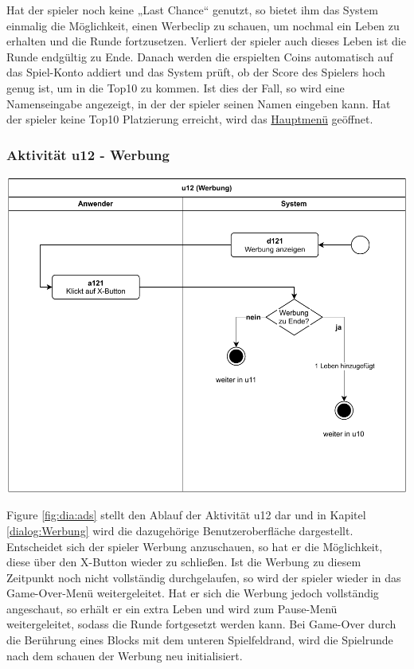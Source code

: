 Hat der \gls{spieler} noch keine „Last Chance“ genutzt, so bietet ihm das System einmalig die Möglichkeit, einen Werbeclip zu schauen, um nochmal ein Leben zu erhalten und die Runde fortzusetzen. Verliert der \gls{spieler} auch dieses Leben ist die Runde endgültig zu Ende. Danach werden die erspielten Coins automatisch auf das Spiel-Konto addiert und das System prüft, ob der Score des Spielers hoch genug ist, um in die \gls{Top10} zu kommen. Ist dies der Fall, so wird eine Namenseingabe angezeigt, in der der \gls{spieler} seinen Namen eingeben kann. Hat der \gls{spieler} keine \gls{Top10} Platzierung erreicht, wird das \hyperref[fig:dia:mainMenu]{Hauptmenü} geöffnet.
\clearpage

\subsubsection{Aktivität u12 - Werbung}\label{subsec:u12-ads}

\vspace*{1cm}

\includegraphics[width=\linewidth]{diagramme/pdf/UML-Activity-u12.pdf}
\label{fig:dia:ads}
\vspace*{0.5cm}

Figure \ref{fig:dia:ads} stellt den Ablauf der Aktivität u12 dar und in Kapitel \ref{dialog:Werbung} wird die dazugehörige Benutzeroberfläche dargestellt.
Entscheidet sich der \gls{spieler} Werbung anzuschauen, so hat er die Möglichkeit, diese über den X-Button wieder zu schließen. Ist die Werbung zu diesem Zeitpunkt noch nicht vollständig durchgelaufen, so wird der \gls{spieler} wieder in das Game-Over-Menü weitergeleitet. Hat er sich die Werbung jedoch vollständig angeschaut, so erhält er ein extra Leben und wird zum Pause-Menü weitergeleitet, sodass die Runde fortgesetzt werden kann. Bei Game-Over durch die Berührung eines Blocks mit dem unteren Spielfeldrand, wird die Spielrunde nach dem schauen der Werbung neu initialisiert.

